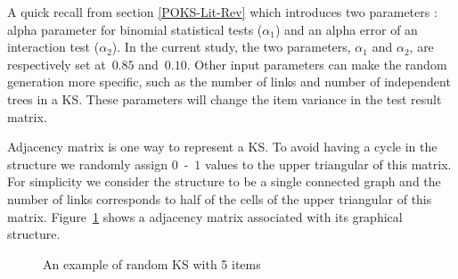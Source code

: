 A quick recall from section \ref{POKS-Lit-Rev} which introduces two parameters : alpha parameter for binomial statistical tests ($\alpha_1$) and an alpha error of an interaction test ($\alpha_2$). In the current study, the two parameters, $\alpha_1$ and $\alpha_2$, are respectively set at~$0.85$ and~$0.10$. 
Other input parameters can make the random generation more specific, such as the number of links and number of independent trees in a KS. These parameters will change the item variance in the test result matrix. 

Adjacency matrix is one way to represent a KS. To avoid having a cycle in the structure we randomly assign $0$~-~$1$ values to the upper triangular of this matrix. For simplicity we consider the structure to be a single connected graph and the number of links corresponds to half of the cells of the upper triangular of this matrix. Figure~\ref{fig:KSExample} shows a adjacency matrix associated with its graphical structure. 


\begin{figure}[h]
\centering 
{}
\qquad
\qquad
{}

\caption{An example of random KS with 5 items}
\label{fig:KSExample}
\end{figure}


